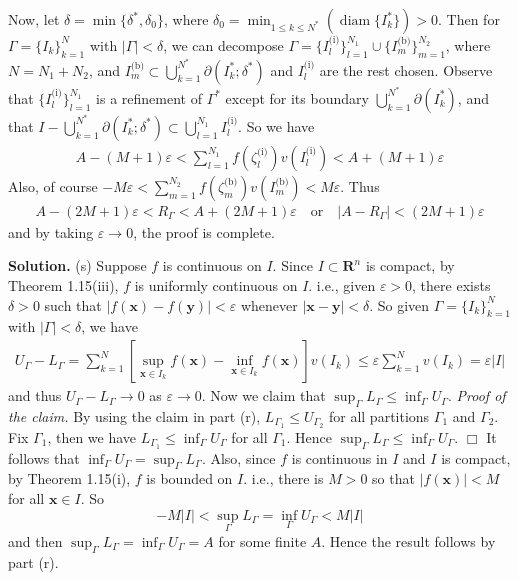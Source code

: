 \documentclass[12pt]{article}
\theoremstyle{definition}
\begin{document}
Now, let $\delta=\min\{\delta^\ast,\delta_0\}$, where $\delta_0=\min_{1\le k\le N^\ast}(\operatorname{diam}\{I^\ast_k\})>0$. Then for $\Gamma=\{I_k\}_{k=1}^N$ with $\left\vert\Gamma\right\vert<\delta$, we can decompose $\Gamma=\{I^{\text{(i)}}_l\}_{l=1}^{N_1}\cup\{I^{\text{(b)}}_m\}_{m=1}^{N_2}$, where $N=N_1+N_2$, and $I^{\text{(b)}}_m\subset\bigcup_{k=1}^{N^\ast}\partial(I^\ast_k;\delta^\ast)$ and $I^{\text{(i)}}_l$ are the rest chosen. Observe that $\{I^{\text{(i)}}_l\}_{l=1}^{N_1}$ is a refinement of $\Gamma^\ast$ except for its boundary $\bigcup_{k=1}^{N^\ast}\partial(I^\ast_k)$, and that $I-\bigcup_{k=1}^{N^\ast}\partial(I^\ast_k;\delta^\ast)\subset\bigcup_{l=1}^{N_1}I^{\text{(i)}}_l$. So we have
\begin{align*}
A-(M+1)\varepsilon
<\sum_{l=1}^{N_1}f(\zeta^{\text{(i)}}_l)v(I^{\text{(i)}}_l)
<A+(M+1)\varepsilon
\end{align*}
Also, of course $-M\varepsilon<\sum_{m=1}^{N_2}f(\zeta^{\text{(b)}}_m)v(I^{\text{(b)}}_m)<M\varepsilon$. Thus
\begin{align*}
A-(2M+1)\varepsilon
<R_\Gamma
<A+(2M+1)\varepsilon\quad\mbox{or}\quad
\left\vert A-R_\Gamma\right\vert<(2M+1)\varepsilon
\end{align*}
and by taking $\varepsilon\to 0$, the proof is complete.

\smallskip
\noindent\textbf{Solution.}\quad
(s) Suppose $f$ is continuous on $I$. Since $I\subset \mathbf{R}^n$ is compact, by Theorem 1.15(iii), $f$ is uniformly continuous on $I$. i.e., given $\varepsilon>0$, there exists $\delta>0$ such that $\left\vert f(\mathbf{x})-f(\mathbf{y})\right\vert<\varepsilon$ whenever $\left\vert\mathbf{x}-\mathbf{y}\right\vert<\delta$. So given $\Gamma=\{I_k\}_{k=1}^N$ with $\left\vert\Gamma\right\vert<\delta$, we have
\begin{align*}
U_{\Gamma}-L_{\Gamma}
=\sum_{k=1}^N\left[\sup_{\mathbf{x}\in I_k} f(\mathbf{x})-\inf_{\mathbf{x}\in I_k} f(\mathbf{x})\right]v(I_k)
\le\varepsilon\sum_{k=1}^Nv(I_k)
=\varepsilon\left\vert I\right\vert
\end{align*}
and thus $U_{\Gamma}-L_{\Gamma}\to 0$ as $\varepsilon\to 0$. Now we claim that $\sup_{\Gamma}L_\Gamma\le\inf_{\Gamma}U_\Gamma$. 
\textit{Proof of the claim.} By using the claim in part (r), $L_{\Gamma_1}\le U_{\Gamma_2}$ for all partitions $\Gamma_1$ and $\Gamma_2$. Fix $\Gamma_1$, then we have $L_{\Gamma_1}\le \inf_{\Gamma}U_{\Gamma}$ for all $\Gamma_1$. Hence $\sup_{\Gamma}L_{\Gamma}\le \inf_{\Gamma}U_{\Gamma}$. $\Box$
It follows that $\inf_{\Gamma}U_\Gamma=\sup_{\Gamma}L_\Gamma$. Also, since $f$ is continuous in $I$ and $I$ is compact, by Theorem 1.15(i), $f$ is bounded on $I$. i.e., there is $M>0$ so that $\left\vert f(\mathbf{x})\right\vert<M$ for all $\mathbf{x}\in I$. So
$$
-M\left\vert I\right\vert<\sup_{\Gamma}L_\Gamma=\inf_{\Gamma}U_\Gamma<M\left\vert I\right\vert
$$
and then $\sup_{\Gamma}L_\Gamma=\inf_{\Gamma}U_\Gamma=A$ for some finite $A$. Hence the result follows by part (r).
\end{document}

